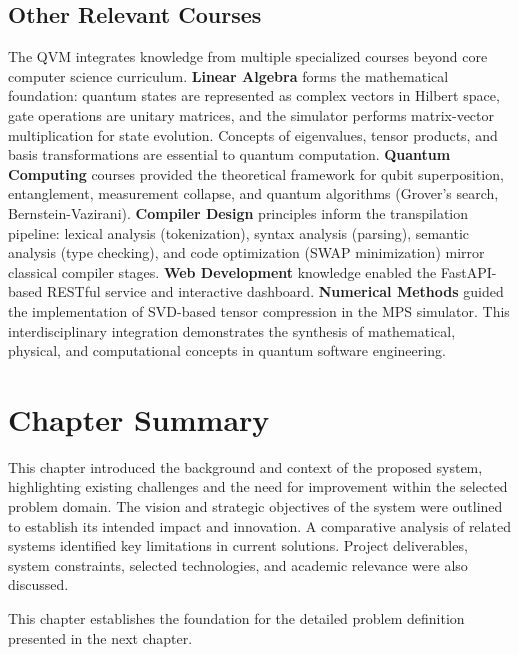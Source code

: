 \subsection{Other Relevant Courses}

The QVM integrates knowledge from multiple specialized courses beyond core computer science curriculum. \textbf{Linear Algebra} forms the mathematical foundation: quantum states are represented as complex vectors in Hilbert space, gate operations are unitary matrices, and the simulator performs matrix-vector multiplication for state evolution. Concepts of eigenvalues, tensor products, and basis transformations are essential to quantum computation. \textbf{Quantum Computing} courses provided the theoretical framework for qubit superposition, entanglement, measurement collapse, and quantum algorithms (Grover's search, Bernstein-Vazirani). \textbf{Compiler Design} principles inform the transpilation pipeline: lexical analysis (tokenization), syntax analysis (parsing), semantic analysis (type checking), and code optimization (SWAP minimization) mirror classical compiler stages. \textbf{Web Development} knowledge enabled the FastAPI-based RESTful service and interactive dashboard. \textbf{Numerical Methods} guided the implementation of SVD-based tensor compression in the MPS simulator. This interdisciplinary integration demonstrates the synthesis of mathematical, physical, and computational concepts in quantum software engineering.

\section{Chapter Summary}

This chapter introduced the background and context of the proposed system, 
highlighting existing challenges and the need for improvement within the 
selected problem domain. The vision and strategic objectives of the system 
were outlined to establish its intended impact and innovation. A comparative 
analysis of related systems identified key limitations in current solutions. 
Project deliverables, system constraints, selected technologies, and academic 
relevance were also discussed. 

This chapter establishes the foundation for the detailed problem definition 
presented in the next chapter.
